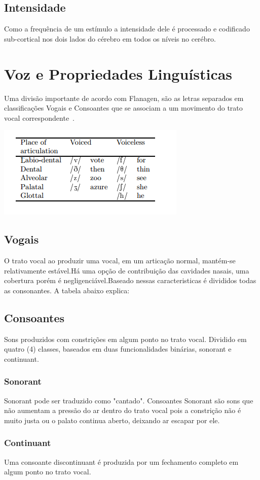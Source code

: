 	\subsection{Intensidade}
	Como a frequência de um estímulo a intensidade dele é processado e codificado sub-cortical nos dois lados do cérebro em todos os níveis no cerébro.\cite{Foundation1}
	
	
	
	\section{Voz e Propriedades Linguísticas}
	Uma divisão importante de acordo com Flanagen, são as letras separados em classificações Vogais e Consoantes que se associam a um movimento do trato vocal correspondente~\cite{JFlanagan}.
	
	\includegraphics{tabelaConsoantes.png}
	
	\subsection{Vogais}
	
	O trato vocal ao produzir uma vocal, em um articação normal, mantém-se relativamente estável.Há uma opção de contribuição das cavidades nasais, uma cobertura porém é negligenciável.Baseado nessas caracteristicas é divididos todas as consonantes. A tabela abaixo explica:
	
	
	\subsection{Consoantes}
	Sons produzidos com constrições em algum ponto no trato vocal. Dividido em quatro (4) classes, baseados em duas funcionalidades binárias, sonorant e continuant.
	
	
	\subsubsection{Sonorant}	 
	Sonorant pode ser traduzido como "cantado". Consoantes Sonorant são sons que não aumentam a pressão do ar dentro do trato vocal pois a constrição não é muito justa ou o palato continua aberto, deixando ar escapar por ele.
	
	\subsubsection{Continuant}
	Uma consoante discontinuant é produzida por um fechamento completo em algum ponto no trato vocal.
	

 

